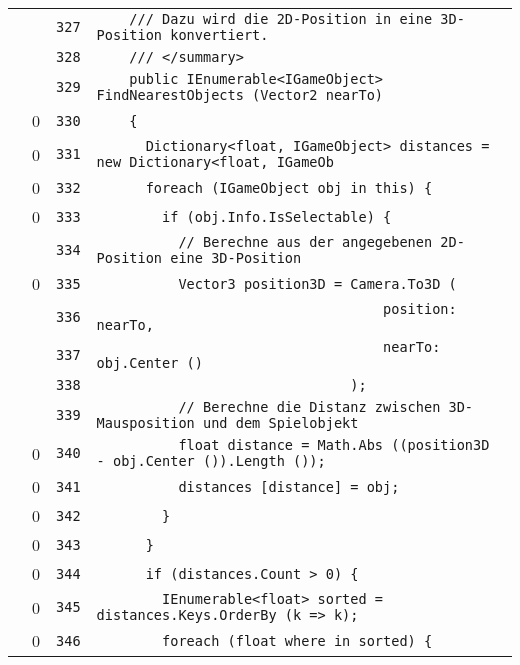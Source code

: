 \documentclass[a4paper,10pt]{article}
\begin{document}
\begin{longtable}[l]{lrrl}
\cellcolor{gray} &  & \verb~327~ & \verb~    /// Dazu wird die 2D-Position in eine 3D-Position konvertiert.~\\
\cellcolor{gray} &  & \verb~328~ & \verb~    /// </summary>~\\
\cellcolor{gray} &  & \verb~329~ & \verb~    public IEnumerable<IGameObject> FindNearestObjects (Vector2 nearTo)~\\
\cellcolor{red} & 0 & \verb~330~ & \verb~    {~\\
\cellcolor{red} & 0 & \verb~331~ & \verb~      Dictionary<float, IGameObject> distances = new Dictionary<float, IGameOb~\\
\cellcolor{red} & 0 & \verb~332~ & \verb~      foreach (IGameObject obj in this) {~\\
\cellcolor{red} & 0 & \verb~333~ & \verb~        if (obj.Info.IsSelectable) {~\\
\cellcolor{gray} &  & \verb~334~ & \verb~          // Berechne aus der angegebenen 2D-Position eine 3D-Position~\\
\cellcolor{red} & 0 & \verb~335~ & \verb~          Vector3 position3D = Camera.To3D (~\\
\cellcolor{gray} &  & \verb~336~ & \verb~                                   position: nearTo,~\\
\cellcolor{gray} &  & \verb~337~ & \verb~                                   nearTo: obj.Center ()~\\
\cellcolor{gray} &  & \verb~338~ & \verb~                               );~\\
\cellcolor{gray} &  & \verb~339~ & \verb~          // Berechne die Distanz zwischen 3D-Mausposition und dem Spielobjekt~\\
\cellcolor{red} & 0 & \verb~340~ & \verb~          float distance = Math.Abs ((position3D - obj.Center ()).Length ());~\\
\cellcolor{red} & 0 & \verb~341~ & \verb~          distances [distance] = obj;~\\
\cellcolor{red} & 0 & \verb~342~ & \verb~        }~\\
\cellcolor{red} & 0 & \verb~343~ & \verb~      }~\\
\cellcolor{red} & 0 & \verb~344~ & \verb~      if (distances.Count > 0) {~\\
\cellcolor{red} & 0 & \verb~345~ & \verb~        IEnumerable<float> sorted = distances.Keys.OrderBy (k => k);~\\
\cellcolor{red} & 0 & \verb~346~ & \verb~        foreach (float where in sorted) {~\\

\end{longtable}
\end{document}

